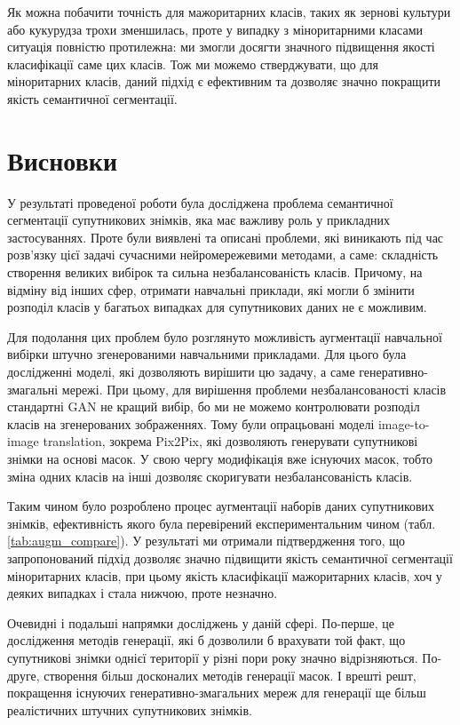 \documentclass{ConfFTI}
\begin{document}
Як можна побачити точність для мажоритарних класів, таких як
зернові культури або кукурудза трохи зменшилась,
проте у випадку з міноритарними класами ситуація повністю протилежна:
ми змогли досягти значного підвищення якості класифікації саме цих класів.
Тож ми можемо стверджувати, що для міноритарних класів, даний
підхід є ефективним та дозволяє значно покращити якість
семантичної сегментації.


\section*{Висновки}

У результаті проведеної роботи була досліджена проблема
семантичної сегментації супутникових знімків, яка має важливу
роль у прикладних застосуваннях. Проте були виявлені та описані
проблеми, які виникають під час розв'язку цієї задачі сучасними
нейромережевими методами, а саме: складність створення великих
вибірок та сильна незбалансованість класів. Причому, на відміну від
інших сфер, отримати навчальні приклади, які могли б змінити розподіл
класів у багатьох випадках для супутникових даних не є можливим.

Для подолання цих проблем було розглянуто можливість аугментації
навчальної вибірки штучно згенерованими навчальними прикладами.
Для цього була дослідженні моделі, які дозволяють вирішити цю задачу,
а саме генеративно-змагальні мережі. При цьому, для вирішення проблеми
незбалансованості класів стандартні GAN не кращий вибір, бо
ми не можемо контролювати розподіл класів на згенерованих зображеннях.
Тому були опрацьовані моделі image-to-image translation, зокрема Pix2Pix,
які дозволяють генерувати супутникові знімки на основі масок.
У свою чергу модифікація вже існуючих масок, тобто зміна одних
класів на інші дозволяє скоригувати незбалансованість класів.

Таким чином було розроблено процес аугментації наборів даних супутникових
знімків, ефективність якого була перевірений експериментальним чином (табл. \ref{tab:augm_compare}).
У результаті ми отримали підтвердження того, що запропонований
підхід дозволяє значно підвищити якість семантичної сегментації
міноритарних класів, при цьому якість класифікації мажоритарних класів, хоч
у деяких випадках і стала нижчою, проте незначно.

Очевидні і подальші напрямки досліджень у даній сфері. По-перше, це
дослідження методів генерації, які б дозволили б врахувати той факт,
що супутникові знімки однієї території у різні пори року значно відрізняються.
По-друге, створення більш досконалих методів генерації масок.
І врешті решт, покращення існуючих генеративно-змагальних мереж
для генерації ще більш реалістичних штучних супутникових знімків.






\balance
\end{document}
